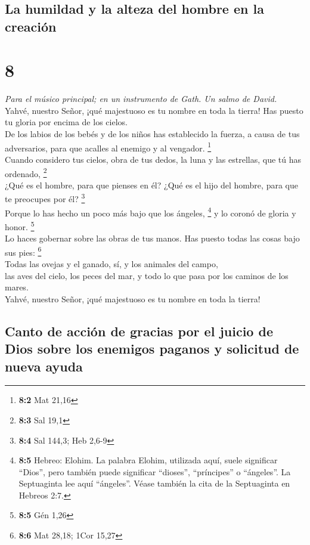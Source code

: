 \hypertarget{la-humildad-y-la-alteza-del-hombre-en-la-creaciuxf3n}{%
\subsection{La humildad y la alteza del hombre en la
creación}\label{la-humildad-y-la-alteza-del-hombre-en-la-creaciuxf3n}}

\hypertarget{section-7}{%
\section{8}\label{section-7}}

\emph{Para el músico principal; en un instrumento de Gath. Un salmo de
David.}\\
 Yahvé, nuestro Señor, ¡qué majestuoso es tu nombre en
toda la tierra! Has puesto tu gloria por encima de los cielos.\\
 De los labios de los bebés y de los niños has establecido
la fuerza, a causa de tus adversarios, para que acalles al enemigo y al
vengador. \footnote{\textbf{8:2} Mat 21,16}\\
 Cuando considero tus cielos, obra de tus dedos, la luna y
las estrellas, que tú has ordenado, \footnote{\textbf{8:3} Sal 19,1}\\
 ¿Qué es el hombre, para que pienses en él? ¿Qué es el
hijo del hombre, para que te preocupes por él? \footnote{\textbf{8:4}
  Sal 144,3; Heb 2,6-9}\\
 Porque lo has hecho un poco más bajo que los ángeles,
\footnote{\textbf{8:5} Hebreo: Elohim. La palabra Elohim, utilizada
  aquí, suele significar ``Dios'', pero también puede significar
  ``dioses'', ``príncipes'' o ``ángeles''. La Septuaginta lee aquí
  ``ángeles''. Véase también la cita de la Septuaginta en Hebreos 2:7.}
y lo coronó de gloria y honor. \footnote{\textbf{8:5} Gén 1,26}\\
 Lo haces gobernar sobre las obras de tus manos. Has
puesto todas las cosas bajo sus pies: \footnote{\textbf{8:6} Mat 28,18;
  1Cor 15,27}\\
 Todas las ovejas y el ganado, sí, y los animales del
campo,\\
 las aves del cielo, los peces del mar, y todo lo que pasa
por los caminos de los mares.\\
 Yahvé, nuestro Señor, ¡qué majestuoso es tu nombre en
toda la tierra!

\hypertarget{canto-de-acciuxf3n-de-gracias-por-el-juicio-de-dios-sobre-los-enemigos-paganos-y-solicitud-de-nueva-ayuda}{%
\subsection{Canto de acción de gracias por el juicio de Dios sobre los
enemigos paganos y solicitud de nueva
ayuda}\label{canto-de-acciuxf3n-de-gracias-por-el-juicio-de-dios-sobre-los-enemigos-paganos-y-solicitud-de-nueva-ayuda}}

